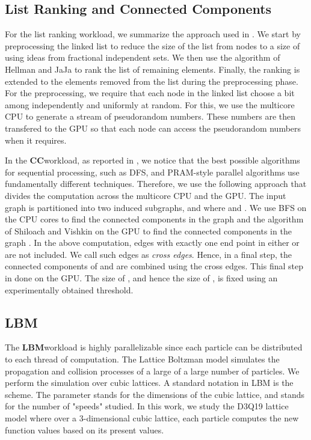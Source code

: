\documentclass[11pt]{article}
\newcommand{\CC} {{\bf CC}}
\newcommand{\LBM} {{\bf LBM}}
\begin{document}
\subsection{List Ranking and Connected Components}
For the list ranking workload, we summarize the approach used in
\cite{hipc11,lspp12}. We start by preprocessing the linked list to reduce 
the size of the list from  nodes to a size of  using ideas from
fractional independent sets. We then use the algorithm of Hellman and JaJa
\cite{HJ99} to rank the list of remaining elements. Finally, the ranking is
extended to the elements removed from the list during the preprocessing
phase. For the preprocessing, we require that each node in the linked list
choose a bit among  independently and uniformly at random. For
this, we use the multicore CPU to generate a stream of pseudorandom
numbers. These numbers are then transfered to the GPU so that each node can
access the pseudorandom numbers when it requires. 

In the \CC workload, as reported in \cite{hipc11},
we notice that the best possible algorithms for
sequential processing, such as DFS, and PRAM-style parallel algorithms use
fundamentally different techniques. Therefore, we use the following
approach that divides the computation across the multicore CPU and the
GPU. The input  graph  is partitioned into two induced subgraphs,
 and  where  and . We use BFS on the CPU cores to find the connected components in the 
graph  and the algorithm of Shiloach and Vishkin \cite{sv} on the
GPU to find the connected components in the graph .
In the above computation, edges with exactly one end point in either 
or  are not included. We call such edges as {\em cross edges}. 
Hence, in a final step, the connected components of  and  are
combined using the cross edges. This final step in done on the GPU. The
size of , and hence the size of , is fixed using an
experimentally obtained threshold. 


\subsection{LBM}
The \LBM workload is highly parallelizable since each particle can be distributed to
each thread of computation. The Lattice Boltzman model simulates the
propagation and collision processes of a large of a large number of
particles. We perform the simulation over cubic lattices. 
A standard notation in LBM is the  scheme. The parameter  stands
for the dimensions of the cubic lattice, and  stands for the number of
"speeds" studied. In this work, we study the D3Q19 lattice
model where over a 3-dimensional cubic lattice, each particle computes the new
function values based on its present values. 
\end{document}
